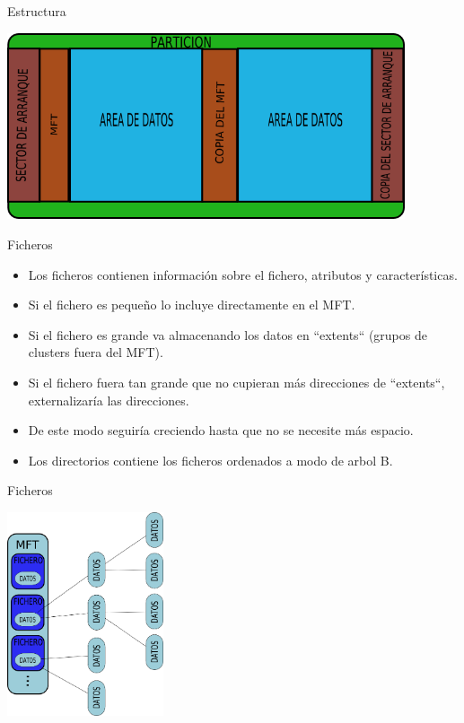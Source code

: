 \begin{frame}{Estructura}
  \begin{center}
    \includegraphics[height=5.5cm]{imgs/ntfs_struct.png}
  \end{center}
\end{frame}

\begin{frame}{Ficheros}
  \begin{itemize}
    \item Los ficheros contienen información sobre el fichero, atributos y características.
    \item Si el fichero es pequeño lo incluye directamente en el MFT.
    \item Si el fichero es grande va almacenando los datos en ``extents`` (grupos de clusters fuera del MFT).
    \item Si el fichero fuera tan grande que no cupieran más direcciones de ``extents``, externalizaría las direcciones.
    \item De este modo seguiría creciendo hasta que no se necesite más espacio.
    \item Los directorios contiene los ficheros ordenados a modo de arbol B.
  \end{itemize}
\end{frame}

\begin{frame}{Ficheros}
  \begin{center}
    \includegraphics[height=6cm]{imgs/ntfs_files.png}
  \end{center}
\end{frame}
